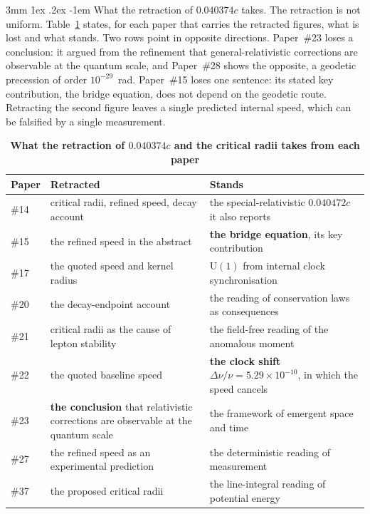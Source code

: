 \documentclass[%
 reprint, amsmath,amssymb, aps, prb, ]{revtex4-2}
\makeatletter
\numberwithin{equation}{section}
\renewcommand\paragraph{%
  \@startsection{paragraph}{4}{\z@}%
    {3mm \@plus 1ex \@minus .2ex}%
    {-1em}%
    {\normalfont\normalsize\itshape}}
\makeatother
\begin{document}
\paragraph{What the retraction of $0.040374c$ takes.} The retraction is not uniform. Table~\ref{tab:retract} states, for each paper that carries the retracted figures, what is lost and what stands. Two rows point in opposite directions. Paper~\#23 loses a conclusion: it argued from the refinement that general-relativistic corrections are observable at the quantum scale, and Paper~\#28 shows the opposite, a geodetic precession of order $10^{-29}$~rad. Paper~\#15 loses one sentence: its stated key contribution, the bridge equation, does not depend on the geodetic route. Retracting the second figure leaves a single predicted internal speed, which can be falsified by a single measurement.

\begin{table}[t!]
\centering
\caption{\textbf{What the retraction of $0.040374c$ and the critical radii takes from each paper}}
\label{tab:retract}
\renewcommand{\arraystretch}{1.3}
\setlength{\tabcolsep}{7pt}
\begin{tabular}{>{\raggedright\arraybackslash}p{1.2cm}>{\raggedright\arraybackslash}p{7.2cm}>{\raggedright\arraybackslash}p{7.6cm}}
\toprule
\textbf{Paper} & \textbf{Retracted} & \textbf{Stands} \\
\midrule
\#14 & critical radii, refined speed, decay account & the special-relativistic $0.040472c$ it also reports \\
\#15 & the refined speed in the abstract & \textbf{the bridge equation}, its key contribution \\
\#17 & the quoted speed and kernel radius & $\mathrm{U}(1)$ from internal clock synchronisation \\
\#20 & the decay-endpoint account & the reading of conservation laws as consequences \\
\#21 & critical radii as the cause of lepton stability & the field-free reading of the anomalous moment \\
\#22 & the quoted baseline speed & \textbf{the clock shift $\Delta\nu/\nu = 5.29\times10^{-10}$}, in which the speed cancels \\
\#23 & \textbf{the conclusion} that relativistic corrections are observable at the quantum scale & the framework of emergent space and time \\
\#27 & the refined speed as an experimental prediction & the deterministic reading of measurement \\
\#37 & the proposed critical radii & the line-integral reading of potential energy \\
\bottomrule
\end{tabular}
\end{table}
\end{document}
